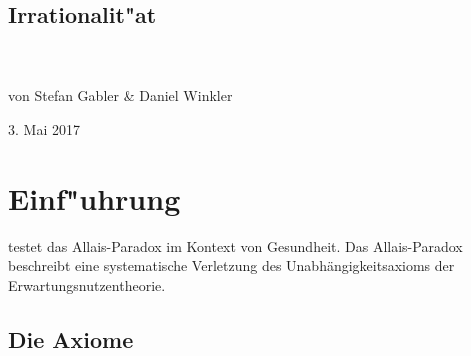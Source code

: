 \documentclass[11pt]{article}
\begin{document}
\thispagestyle{plain}
\begin{center}
  \section*{Irrationalit"at} %
  \textbf{\textcite{oliver2003quantitative}\\}\\
  \large{von Stefan Gabler \& Daniel Winkler}
  
  {\large 3. Mai 2017\par}
\end{center}

\section{Einf"uhrung}
\label{sec:einfuhrung}

\textcite{oliver2003quantitative} testet das Allais-Paradox im Kontext von Gesundheit. Das Allais-Paradox beschreibt eine systematische Verletzung des Unabh\"angigkeitsaxioms der Erwartungsnutzentheorie. 

\subsection{Die Axiome}
\label{sec:die-axiome}
\end{document}
